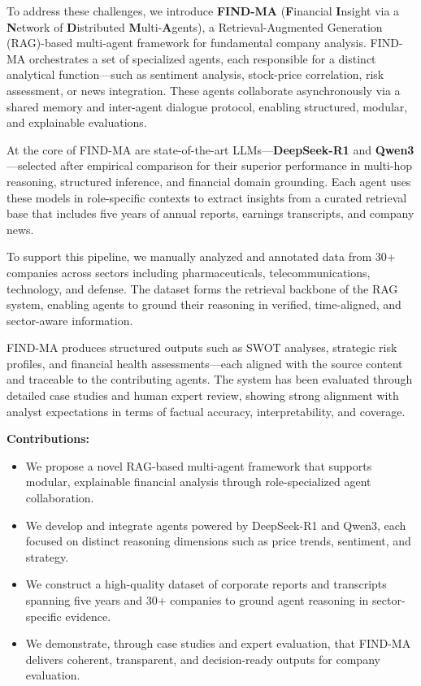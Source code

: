\documentclass[11pt]{article}
\newcommand{\findma}{\textsc{FIND-MA}}
\begin{document}
To address these challenges, we introduce \textbf{\findma{}} (\textbf{F}inancial \textbf{I}nsight via a \textbf{N}etwork of \textbf{D}istributed \textbf{M}ulti-\textbf{A}gents), a Retrieval-Augmented Generation (RAG)-based multi-agent framework for fundamental company analysis. \findma{} orchestrates a set of specialized agents, each responsible for a distinct analytical function—such as sentiment analysis, stock-price correlation, risk assessment, or news integration. These agents collaborate asynchronously via a shared memory and inter-agent dialogue protocol, enabling structured, modular, and explainable evaluations.

At the core of \findma{} are state-of-the-art LLMs—\textbf{DeepSeek-R1} and \textbf{Qwen3}—selected after empirical comparison for their superior performance in multi-hop reasoning, structured inference, and financial domain grounding. Each agent uses these models in role-specific contexts to extract insights from a curated retrieval base that includes five years of annual reports, earnings transcripts, and company news.

To support this pipeline, we manually analyzed and annotated data from 30+ companies across sectors including pharmaceuticals, telecommunications, technology, and defense. The dataset forms the retrieval backbone of the RAG system, enabling agents to ground their reasoning in verified, time-aligned, and sector-aware information.

\findma{} produces structured outputs such as SWOT analyses, strategic risk profiles, and financial health assessments—each aligned with the source content and traceable to the contributing agents. The system has been evaluated through detailed case studies and human expert review, showing strong alignment with analyst expectations in terms of factual accuracy, interpretability, and coverage.

\textbf{Contributions:}
\begin{itemize}
    \item We propose a novel RAG-based multi-agent framework that supports modular, explainable financial analysis through role-specialized agent collaboration.
    \item We develop and integrate agents powered by DeepSeek-R1 and Qwen3, each focused on distinct reasoning dimensions such as price trends, sentiment, and strategy.
    \item We construct a high-quality dataset of corporate reports and transcripts spanning five years and 30+ companies to ground agent reasoning in sector-specific evidence.
    \item We demonstrate, through case studies and expert evaluation, that \findma{} delivers coherent, transparent, and decision-ready outputs for company evaluation.
\end{itemize}
\end{document}
